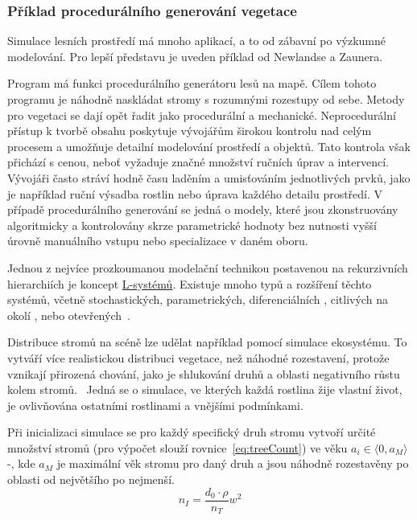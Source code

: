 \subsubsection{Příklad procedurálního generování vegetace}
\label{proceduralExample}
Simulace lesních prostředí má mnoho aplikací, a to od zábavní po výzkumné modelování. Pro lepší představu je uveden příklad od Newlandse a Zaunera.~\cite{newlands2022procedural}

Program má funkci procedurálního generátoru lesů na mapě. Cílem tohoto programu je náhodně naskládat stromy s rozumnými rozestupy od sebe. Metody pro vegetaci se dají opět řadit jako procedurální a mechanické. Neprocedurální přístup k tvorbě obsahu poskytuje vývojářům širokou kontrolu nad celým procesem a umožňuje detailní modelování prostředí a objektů. Tato kontrola však přichází s cenou, neboť vyžaduje značné množství ručních úprav a intervencí. Vývojáři často stráví hodně času laděním a umisťováním jednotlivých prvků, jako je například ruční výsadba rostlin nebo úprava každého detailu prostředí. V případě procedurálního generování se jedná o modely, které jsou zkonstruovány algoritmicky a kontrolovány skrze parametrické hodnoty bez nutnosti vyšší úrovně manuálního vstupu nebo specializace v daném oboru.

Jednou z nejvíce prozkoumanou modelační technikou postavenou na rekurzivních hierarchiích je koncept \hyperref[lsystems]{L-systémů}. Existuje mnoho typů a rozšíření těchto systémů\cite{prusinkiewicz1986graphical}, včetně stochastických, parametrických, diferenciálních \cite{animationOfPlantDevelopment.}, citlivých na okolí \cite{syntheticTopiary}, nebo otevřených~\cite{PrusinkiewiczModelsOfPlants}.

Distribuce stromů na scéně lze udělat například pomocí simulace ekosystému. To vytváří více realistickou distribuci vegetace, než náhodné rozestavení, protože vznikají přirozená chování, jako je shlukování druhů a oblasti negativního růstu kolem stromů.~\cite{newlands2022procedural} Jedná se o simulace, ve kterých každá rostlina žije vlastní život, je ovlivňována ostatními rostlinami a vnějšími podmínkami.~\cite{Benes02ICCVG} 

Při inicializaci simulace se pro každý specifický druh stromu vytvoří určité množství stromů (pro výpočet slouží rovnice~\ref{eq:treeCount}) ve věku $a_i\in\langle0,a_M\rangle$-, kde $a_M$ je maximální věk stromu pro daný druh a jsou náhodně rozestavěny po oblasti od největšího po nejmenší.~\cite{newlands2022procedural}
\begin{equation}
\label{eq:treeCount} 
	n_I=\frac{d_0\cdot\rho}{n_T}w^2 
\end{equation}

